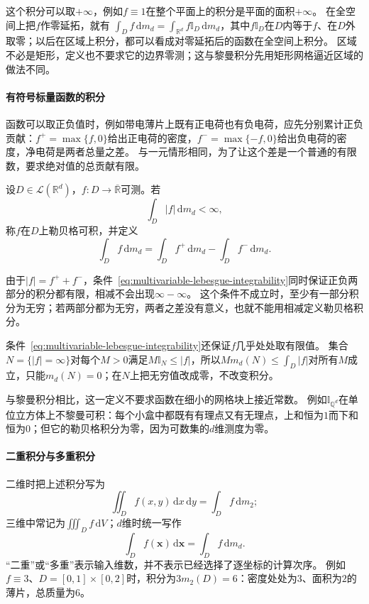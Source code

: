 这个积分可以取$+\infty$，例如$f\equiv1$在整个平面上的积分是平面的面积$+\infty$。
在全空间上把$f$作零延拓，就有
$\int_Df\,\mathrm dm_d=\int_{\mathbb R^d}f\mathbb I_D\,\mathrm dm_d$，其中$f\mathbb I_D$在$D$内等于$f$、在$D$外取零；以后在区域上积分，都可以看成对零延拓后的函数在全空间上积分。
区域不必是矩形，定义也不要求它的边界零测；这与黎曼积分先用矩形网格逼近区域的做法不同。

\paragraph{有符号标量函数的积分}

函数可以取正负值时，例如带电薄片上既有正电荷也有负电荷，应先分别累计正负贡献：$f^+=\max\{f,0\}$给出正电荷的密度，$f^-=\max\{-f,0\}$给出负电荷的密度，净电荷是两者总量之差。
与一元情形相同，为了让这个差是一个普通的有限数，要求绝对值的总贡献有限。
\begin{definition}[区域上可测函数的积分]
设$D\in\mathcal L(\mathbb R^d)$，$f:D\to\overline{\mathbb R}$可测。若
\begin{equation}
 \int_D|f|\,\mathrm dm_d<\infty,
 \label{eq:multivariable-lebesgue-integrability}
\end{equation}
称$f$在$D$上勒贝格可积，并定义
\[
 \int_Df\,\mathrm dm_d=\int_Df^+\,\mathrm dm_d-\int_Df^-\,\mathrm dm_d.
\]
\end{definition}

由于$|f|=f^++f^-$，条件~\eqref{eq:multivariable-lebesgue-integrability}同时保证正负两部分的积分都有限，相减不会出现$\infty-\infty$。
这个条件不成立时，至少有一部分积分为无穷；若两部分都为无穷，两者之差没有意义，也就不能用相减定义勒贝格积分。

条件~\eqref{eq:multivariable-lebesgue-integrability}还保证$f$几乎处处取有限值。
集合$N=\{|f|=\infty\}$对每个$M>0$满足$M\mathbb I_N\leq|f|$，所以$Mm_d(N)\leq\int_D|f|$对所有$M$成立，只能$m_d(N)=0$；在$N$上把无穷值改成零，不改变积分。

与黎曼积分相比，这一定义不要求函数在细小的网格块上接近常数。
例如$\mathbb I_{\mathbb Q^d}$在单位立方体上不黎曼可积：每个小盒中都既有有理点又有无理点，上和恒为$1$而下和恒为$0$；但它的勒贝格积分为零，因为可数集的$d$维测度为零。

\paragraph{二重积分与多重积分}

二维时把上述积分写为
\[
 \iint_Df(x,y)\,\mathrm dx\,\mathrm dy=\int_Df\,\mathrm dm_2;
\]
三维中常记为$\iiint_Df\,\mathrm dV$；$d$维时统一写作
\[
 \int_Df(\bm x)\,\mathrm d\bm x=\int_Df\,\mathrm dm_d.
\]
“二重”或“多重”表示输入维数，并不表示已经选择了逐坐标的计算次序。
例如$f\equiv3$、$D=[0,1]\times[0,2]$时，积分为$3m_2(D)=6$：密度处处为$3$、面积为$2$的薄片，总质量为$6$。

